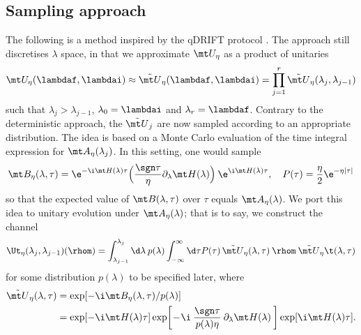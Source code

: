\subsection{Sampling approach}
The following is a method inspired by the qDRIFT protocol \cite{}. The approach still discretises $\lambda$ space, in that we approximate $\mt U_\eta$ as a product of unitaries
\begin{align}
    \mt U_\eta(\lambdaf, \lambdai) \approx \tilde{\mt U}_\eta(\lambdaf, \lambdai) = \prod_{j=1}^r \tilde{\mt U}_\eta(\lambda_j, \lambda_{j-1})
\end{align}
such that $\lambda_j > \lambda_{j-1}$, $\lambda_0 = \lambdai$ and $\lambda_r = \lambdaf$. Contrary to the deterministic approach, the $\tilde{\mt U}_j$ are now sampled according to an appropriate distribution. The idea is based on a Monte Carlo evaluation of the time integral expression for $\mt A_\eta(\lambda_j)$. In this setting, one would sample
\begin{align}
    \mt B_\eta(\lambda, \tau) = \e^{-\i \mt H(\lambda) \tau} \Big( \frac{\sgn\tau}\eta \partial_\lambda \mt H(\lambda) \Big) \> \e^{\i \mt H(\lambda) \tau}, \quad P(\tau) = \frac\eta2 \e^{-\eta|\tau|}
\end{align}
so that the expected value of $\mt B(\lambda, \tau)$ over $\tau$ equals $\mt A_\eta(\lambda)$. We port this idea to unitary evolution under $\mt A_\eta(\lambda)$; that is to say, we construct the channel
\begin{align}
    \Ut_\eta(\lambda_j, \lambda_{j-1})(\rhom) = \int_{\lambda_{j-1}}^{\lambda_j} \d\lambda \> p(\lambda) \int_{-\infty}^{\infty} \d\tau P(\tau) \, \tilde{\mt U}_\eta(\lambda, \tau) \> \rhom \> \tilde{\mt U}_\eta\t(\lambda, \tau)
\end{align}
for some distribution $p(\lambda)$ to be specified later, where
\begin{align}
    \tilde{\mt U}_\eta(\lambda, \tau) &= \exp[-\i \mt B_\eta(\lambda, \tau) / p(\lambda)] \nonumber \\
    &= \exp[-\i \mt H(\lambda) \tau] \exp \! \bigg[ \!-\!\i \> \frac{\sgn\tau}{p(\lambda)\eta} \> \partial_\lambda \mt H(\lambda)\> \bigg] \exp[\i \mt H(\lambda)\tau].
\end{align}


